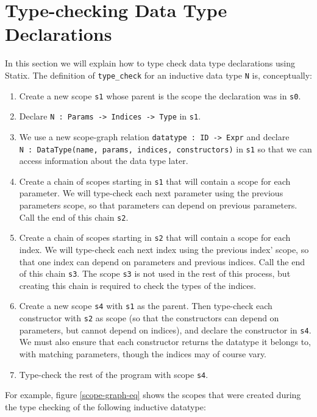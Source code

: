 \section{Type-checking Data Type Declarations}
\label{ch:datatypes:typechecking}
In this section we will explain how to type check data type declarations using Statix.
The definition of \verb|type_check| for an inductive data type \verb|N| is, conceptually:
\begin{enumerate}
	\item Create a new scope \verb|s1| whose parent is the scope the declaration was in \verb|s0|.
	\item \label{name-decl}Declare \verb|N : Params -> Indices -> Type| in \verb|s1|.
	\item \label{datatype-decl}We use a new scope-graph relation \verb|datatype : ID -> Expr| and declare \\ \verb|N : DataType(name, params, indices, constructors)| in \verb|s1| so that we can access information about the data type later.
	
	\item Create a chain of scopes starting in \verb|s1| that will contain a scope for each parameter. We will type-check each next parameter using the previous parameters scope, so that parameters can depend on previous parameters. Call the end of this chain \verb|s2|.
	
	\item Create a chain of scopes starting in \verb|s2| that will contain a scope for each index. We will type-check each next index using the previous index' scope, so that one index can depend on parameters and previous indices. Call the end of this chain \verb|s3|. The scope \verb|s3| is not used in the rest of this process, but creating this chain is required to check the types of the indices.
	
	\item Create a new scope \verb|s4| with \verb|s1| as the parent. Then type-check each constructor with \verb|s2| as scope (so that the constructors can depend on parameters, but cannot depend on indices), and declare the constructor in \verb|s4|. We must also ensure that each constructor returns the datatype it belongs to, with matching parameters, though the indices may of course vary.
	
	\item Type-check the rest of the program with scope \verb|s4|.
\end{enumerate}
For example, figure \ref{scope-graph-eq} shows the scopes that were created during the type checking of the following inductive datatype:
